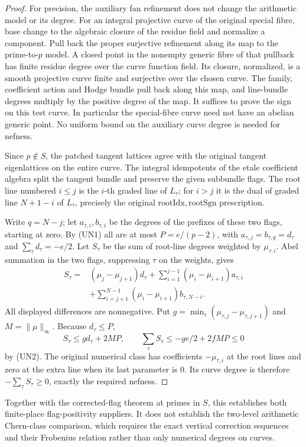 \begin{proof}
For precision, the auxiliary fan refinement does not change the
arithmetic model or its degree. For an integral projective curve
of the original special fibre, base change to the algebraic closure
of the residue field and normalize a component. Pull back the proper
surjective refinement along its map to the prime-to-\(p\) model.
A closed point in the nonempty generic fibre of that pullback has
finite residue degree over the curve function field. Its closure,
normalized, is a smooth projective curve finite and surjective over
the chosen curve. The family, coefficient action and Hodge bundle
pull back along this map, and line-bundle degrees multiply by the
positive degree of the map. It suffices to prove the sign on this
test curve. In particular the special-fibre curve need not have an
abelian generic point. No uniform bound on the auxiliary curve
degree is needed for nefness.

Since \(p\notin S\), the patched tangent lattices agree with the
original tangent eigenlattices on the entire curve. The integral
idempotents of the etale coefficient algebra split the tangent
bundle and preserve the given subbundle flags. The root line
numbered \(i\le j\) is the \(i\)-th graded line of \(L_\tau\);
for \(i>j\) it is the dual of graded line \(N+1-i\) of
\(L_{\bar\tau}\), precisely the original
\(\mathrm{rootIdx},\mathrm{rootSgn}\) prescription.

Write \(q=N-j\); let \(a_{\tau,i},b_{\tau,i}\) be the degrees of
the prefixes of these two flags, starting at zero. By (UN1) all
are at most \(P=e/(p-2)\), with
\(a_{\tau,j}=b_{\tau,q}=d_\tau\) and \(\sum_\tau d_\tau=-e/2\).
Let \(S_\tau\) be the sum of root-line degrees weighted by
\(\mu_{\tau,i}\). Abel summation in the two flags, suppressing
\(\tau\) on the weights, gives
\[
\begin{split}
 S_\tau={}&(\mu_j-\mu_{j+1})d_\tau
 +\sum_{i=1}^{j-1}(\mu_i-\mu_{i+1})a_{\tau,i}\\
 &+\sum_{i=j+1}^{N-1}(\mu_i-\mu_{i+1})b_{\tau,N-i}.
\end{split}
\]
All displayed differences are nonnegative. Put
\(g=\min_\tau(\mu_{\tau,j}-\mu_{\tau,j+1})\) and
\(M=\|\mu\|_\infty\). Because \(d_\tau\le P\),
\[
 S_\tau\le g d_\tau+2MP,\qquad
 \sum_\tau S_\tau\le -ge/2+2fMP\le0
\]
by (UN2). The original numerical class has coefficients
\(-\mu_{\tau,i}\) at the root lines and zero at the extra line
when its last parameter is \(0\). Its curve degree is therefore
\(-\sum_\tau S_\tau\ge0\), exactly the required nefness.
\end{proof}

Together with the corrected-flag theorem at primes in \(S\), this
establishes both finite-place flag-positivity suppliers. It does not
establish the two-level arithmetic Chern-class comparison, which
requires the exact vertical correction sequences and their Frobenius
relation rather than only numerical degrees on curves.
